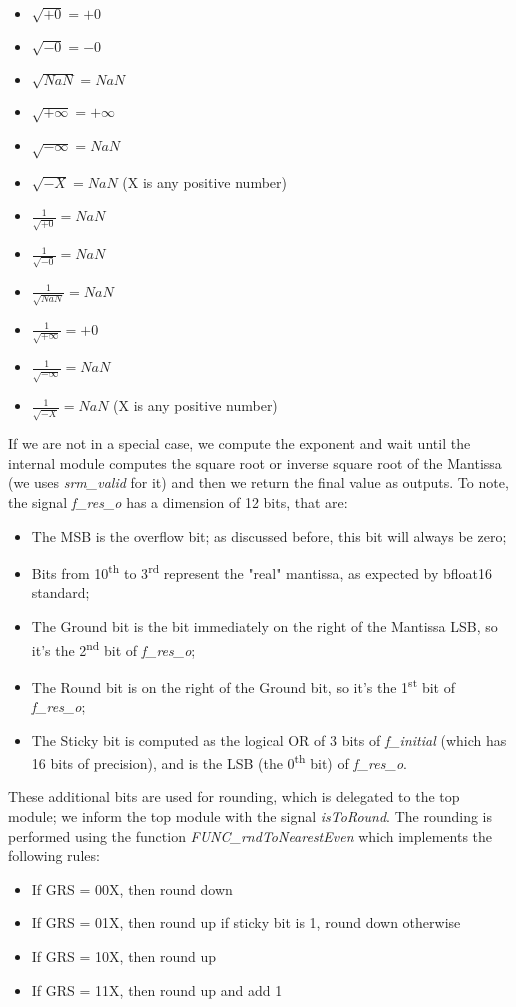 \begin{itemize}
\item $\sqrt{+0} = +0$ 
\item $\sqrt{-0} = -0$
\item $\sqrt{NaN} = NaN$
\item $\sqrt{+ \infty}  =  +\infty$
\item $\sqrt{- \infty} =  NaN$
\item $\sqrt{- X} = NaN$  (X is any positive number) 
\item $\frac{1}{\sqrt{+0}} = NaN$
\item $\frac{1}{\sqrt{-0}} = NaN$
\item $\frac{1}{\sqrt{NaN}} = NaN$
\item $\frac{1}{\sqrt{+\infty}} = +0$
\item $\frac{1}{\sqrt{-\infty}} = NaN$
\item $\frac{1}{\sqrt{-X}} = NaN$  (X is any positive number) 
\end{itemize}

If we are not in a special case, we compute the exponent and wait until the internal module computes the square root or inverse square root of the Mantissa (we uses  \emph{srm\_valid} for it) and then we return the final value as outputs. To note, the signal \emph{f\_res\_o} has a dimension of 12 bits, that are:
\begin{itemize}
\item The MSB is the overflow bit; as discussed before, this bit will always be zero;
\item Bits from 10\textsuperscript{th} to 3\textsuperscript{rd} represent the "real" mantissa, as expected by bfloat16 standard;
\item The Ground bit is the bit immediately on the right of the Mantissa LSB, so it's the 2\textsuperscript{nd} bit of \emph{f\_res\_o};
\item The Round bit is on the right of the Ground bit, so it's the 1\textsuperscript{st} bit of \emph{f\_res\_o};
\item The Sticky bit is computed as the logical OR of 3 bits of \emph{f\_initial} (which has 16 bits of precision), and is the LSB (the 0\textsuperscript{th} bit) of \emph{f\_res\_o}. 
\end{itemize}
These additional bits are used for rounding, which is delegated to the top module; we inform the top module with the signal \emph{isToRound}. The rounding is performed using the function \emph{FUNC\_rndToNearestEven} which implements the following rules:
\begin{itemize}
\item If GRS = 00X, then round down
\item If GRS = 01X, then round up if sticky bit is 1, round down otherwise
\item If GRS = 10X, then round up
\item If GRS = 11X, then round up and add 1
\end{itemize} 

\clearpage
